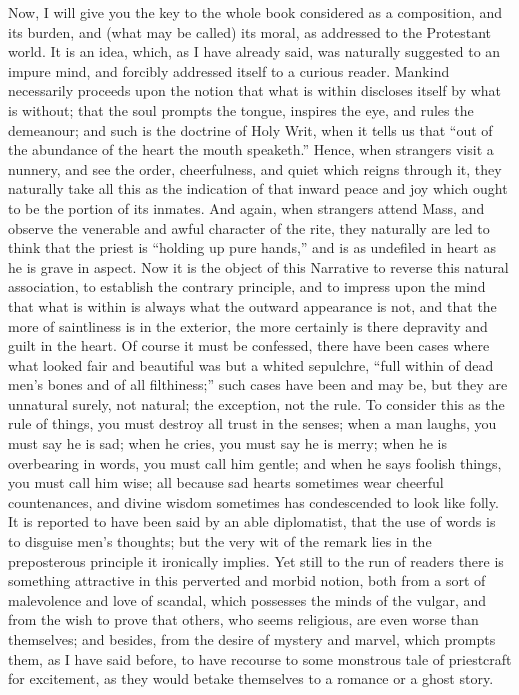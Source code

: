 Now, I will give you the key to the whole book
considered as a composition, and its burden, and (what
may be called) its moral, as addressed to the Protestant
world. It is an idea, which, as I have already said, was
naturally suggested to an impure mind, and forcibly
addressed itself to a curious reader. Mankind necessarily
proceeds upon the notion that what is within discloses
itself by what is without; that the soul prompts the
tongue, inspires the eye, and rules the demeanour; and
such is the doctrine of Holy Writ, when it tells us that
``out of the abundance of the heart the mouth
speaketh.'' Hence, when strangers visit a nunnery,
and see the order, cheerfulness, and quiet which reigns
through it, they naturally take all this as the
indication of that inward peace and joy which ought to be
the portion of its inmates. And again, when strangers
attend Mass, and observe the venerable and awful
character of the rite, they naturally are led to think
that the priest is ``holding up pure hands,'' and
is as undefiled in heart as he is grave in aspect. Now it
is the object of this Narrative to reverse this natural
association, to establish the contrary principle, and to
impress upon the mind that what is within is always what
the outward appearance is not, and that the more of
saintliness is in the exterior, the more certainly is there depravity and guilt in the heart. Of course it must
be confessed, there have been cases where what looked
fair and beautiful was but a whited sepulchre, ``full
within of dead men's bones and of all filthiness;''
such cases have been and may be, but they are unnatural
surely, not natural; the exception, not the rule. To
consider this as the rule of things, you must destroy all
trust in the senses; when a man laughs, you must say he
is sad; when he cries, you must say he is merry; when he
is overbearing in words, you must call him gentle; and
when he says foolish things, you must call him wise; all
because sad hearts sometimes wear cheerful countenances,
and divine wisdom sometimes has condescended to look like
folly. It is reported to have been said by an able
diplomatist, that the use of words is to disguise men's
thoughts; but the very wit of the remark lies in the
preposterous principle it ironically implies. Yet still
to the run of readers there is something attractive in
this perverted and morbid notion, both from a sort of
malevolence and love of scandal, which possesses the
minds of the vulgar, and from the wish to prove that
others, who seems religious, are even worse than
themselves; and besides, from the desire of mystery and
marvel, which prompts them, as I have said before, to
have recourse to some monstrous tale of priestcraft for
excitement, as they would betake themselves to a romance
or a ghost story.

